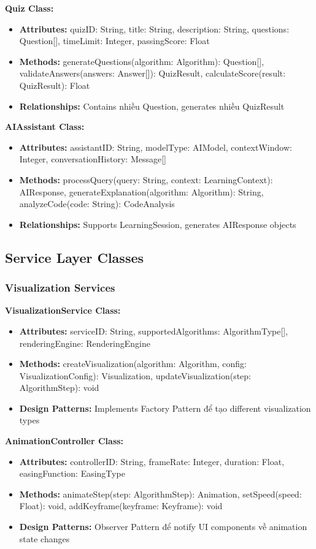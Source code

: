\textbf{Quiz Class:}
\begin{itemize}
    \item \textbf{Attributes:} quizID: String, title: String, description: String, questions: Question[], timeLimit: Integer, passingScore: Float
    \item \textbf{Methods:} generateQuestions(algorithm: Algorithm): Question[], validateAnswers(answers: Answer[]): QuizResult, calculateScore(result: QuizResult): Float
    \item \textbf{Relationships:} Contains nhiều Question, generates nhiều QuizResult
\end{itemize}

\textbf{AIAssistant Class:}
\begin{itemize}
    \item \textbf{Attributes:} assistantID: String, modelType: AIModel, contextWindow: Integer, conversationHistory: Message[]
    \item \textbf{Methods:} processQuery(query: String, context: LearningContext): AIResponse, generateExplanation(algorithm: Algorithm): String, analyzeCode(code: String): CodeAnalysis
    \item \textbf{Relationships:} Supports LearningSession, generates AIResponse objects
\end{itemize}

\subsection{Service Layer Classes}
\label{subsec:service-classes}

\subsubsection{Visualization Services}

\textbf{VisualizationService Class:}
\begin{itemize}
    \item \textbf{Attributes:} serviceID: String, supportedAlgorithms: AlgorithmType[], renderingEngine: RenderingEngine
    \item \textbf{Methods:} createVisualization(algorithm: Algorithm, config: VisualizationConfig): Visualization, updateVisualization(step: AlgorithmStep): void
    \item \textbf{Design Patterns:} Implements Factory Pattern để tạo different visualization types
\end{itemize}

\textbf{AnimationController Class:}
\begin{itemize}
    \item \textbf{Attributes:} controllerID: String, frameRate: Integer, duration: Float, easingFunction: EasingType
    \item \textbf{Methods:} animateStep(step: AlgorithmStep): Animation, setSpeed(speed: Float): void, addKeyframe(keyframe: Keyframe): void
    \item \textbf{Design Patterns:} Observer Pattern để notify UI components về animation state changes
\end{itemize}


